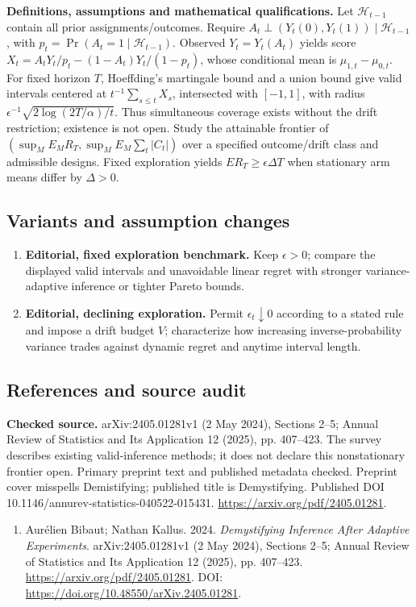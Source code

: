 \documentclass[11pt,a4paper]{article}
\begin{document}
\textbf{Definitions, assumptions and mathematical qualifications.} Let \(\mathcal H_{t-1}\) contain all prior assignments/outcomes. Require \(A_t\perp(Y_t(0),Y_t(1))\mid\mathcal H_{t-1}\), with \(p_t=\Pr(A_t=1\mid\mathcal H_{t-1})\). Observed \(Y_t=Y_t(A_t)\) yields score \(X_t=A_tY_t/p_t-(1-A_t)Y_t/(1-p_t)\), whose conditional mean is \(\mu_{1,t}-\mu_{0,t}\). For fixed horizon \(T\), Hoeffding's martingale bound and a union bound give valid intervals centered at \(t^{-1}\sum_{s\leq t}X_s\), intersected with \([-1,1]\), with radius \(\epsilon^{-1}\sqrt{2\log(2T/\alpha)/t}\). Thus simultaneous coverage exists without the drift restriction; existence is not open. Study the attainable frontier of \((\sup_M E_MR_T,\sup_M E_M\sum_t|C_t|)\) over a specified outcome/drift class and admissible designs. Fixed exploration yields \(E R_T\geq\epsilon\Delta T\) when stationary arm means differ by \(\Delta>0\).
\subsection*{Variants and assumption changes}
\begin{enumerate}
\item \textbf{Editorial, fixed exploration benchmark.} Keep \(\epsilon>0\); compare the displayed valid intervals and unavoidable linear regret with stronger variance-adaptive inference or tighter Pareto bounds.
\item \textbf{Editorial, declining exploration.} Permit \(\epsilon_t\downarrow0\) according to a stated rule and impose a drift budget \(V\); characterize how increasing inverse-probability variance trades against dynamic regret and anytime interval length.
\end{enumerate}
\subsection*{References and source audit}
\textbf{Checked source.} arXiv:2405.01281v1 (2 May 2024), Sections 2--5; Annual Review of Statistics and Its Application 12 (2025), pp. 407--423. The survey describes existing valid-inference methods; it does not declare this nonstationary frontier open. Primary preprint text and published metadata checked. Preprint cover misspells Demistifying; published title is Demystifying. Published DOI 10.1146/annurev-statistics-040522-015431. \url{https://arxiv.org/pdf/2405.01281}.
\begin{enumerate}\raggedright
\item\hypertarget{definitions:source:30007710:1}{} Aurélien Bibaut; Nathan Kallus. 2024. \emph{Demystifying Inference After Adaptive Experiments}. arXiv:2405.01281v1 (2 May 2024), Sections 2--5; Annual Review of Statistics and Its Application 12 (2025), pp. 407--423.
\url{https://arxiv.org/pdf/2405.01281}.
DOI: \url{https://doi.org/10.48550/arXiv.2405.01281}.
\end{enumerate}
\end{document}
